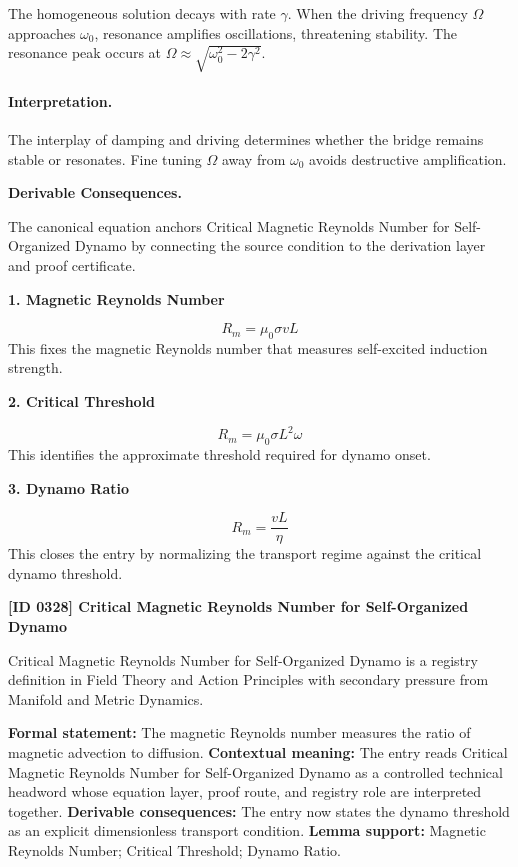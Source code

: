 The homogeneous solution decays with rate $\gamma$.  When the driving frequency $\Omega$ approaches $\omega_0$, resonance amplifies oscillations, threatening stability.
The resonance peak occurs at $\Omega \approx \sqrt{\omega_0^2 - 2\gamma^2}$.

\paragraph{Interpretation.}

The interplay of damping and driving determines whether the bridge remains stable or resonates.  Fine tuning $\Omega$ away from $\omega_0$ avoids destructive amplification.

\par\vspace{0.35em}
\noindent\textbf{Derivable Consequences.}\quad
\begingroup
\footnotesize
\raggedright
The canonical equation anchors Critical Magnetic Reynolds Number for Self-Organized Dynamo by connecting the source condition to the derivation layer and proof certificate.
\par\endgroup

\noindent\textbf{1. Magnetic Reynolds Number}\par
\[
R_m=\mu_0\sigma vL
\]
\noindent This fixes the magnetic Reynolds number that measures self-excited induction strength.\par
\noindent\textbf{2. Critical Threshold}\par
\[
R_m=\mu_0\sigma L^2\omega
\]
\noindent This identifies the approximate threshold required for dynamo onset.\par
\noindent\textbf{3. Dynamo Ratio}\par
\[
R_m=\frac{vL}{\eta}
\]
\noindent This closes the entry by normalizing the transport regime against the critical dynamo threshold.\par

\clearpage
\noindent\textbf{[ID 0328] Critical Magnetic Reynolds Number for Self-Organized Dynamo}\par
\vspace{0.35em}
\begingroup\small
{}
Critical Magnetic Reynolds Number for Self-Organized Dynamo is a registry definition in Field Theory and Action Principles with secondary pressure from Manifold and Metric Dynamics.

\begingroup\footnotesize\setlength{\emergencystretch}{3em}\sloppy
\textbf{Formal statement:} The magnetic Reynolds number measures the ratio of magnetic advection to diffusion. \textbf{Contextual meaning:} The entry reads Critical Magnetic Reynolds Number for Self-Organized Dynamo as a controlled technical headword whose equation layer, proof route, and registry role are interpreted together. \textbf{Derivable consequences:} The entry now states the dynamo threshold as an explicit dimensionless transport condition. \textbf{Lemma support:} Magnetic Reynolds Number; Critical Threshold; Dynamo Ratio.\par
\endgroup


